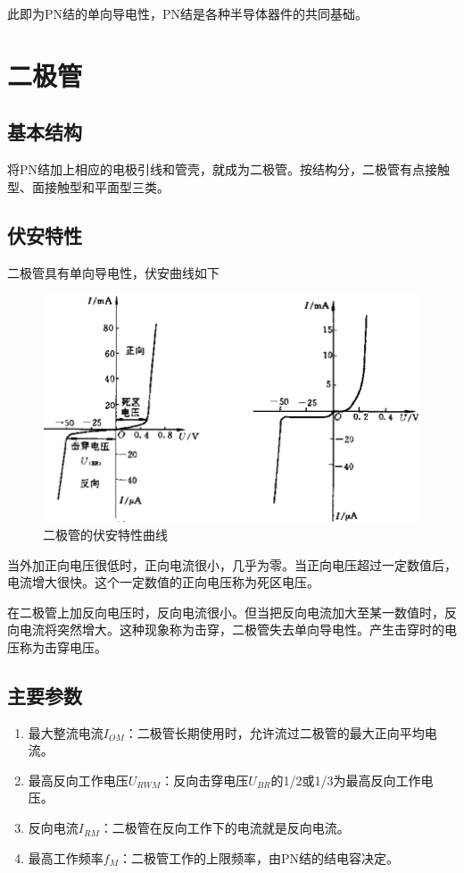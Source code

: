 \documentclass[12pt]{article}
\begin{document}
此即为PN结的单向导电性，PN结是各种半导体器件的共同基础。

\section{二极管}

\subsection{基本结构}

将PN结加上相应的电极引线和管壳，就成为二极管。按结构分，二极管有点接触型、面接触型和平面型三类。

\subsection{伏安特性}

二极管具有单向导电性，伏安曲线如下

\begin{figure}[!h]
    \centering
    \includegraphics[width=.8\textwidth]{graphics/Screenshot 2025-09-23 at 12.21.48.png}
    \caption{二极管的伏安特性曲线}
\end{figure}

当外加正向电压很低时，正向电流很小，几乎为零。当正向电压超过一定数值后，电流增大很快。这个一定数值的正向电压称为死区电压。

在二极管上加反向电压时，反向电流很小。但当把反向电流加大至某一数值时，反向电流将突然增大。这种现象称为击穿，二极管失去单向导电性。产生击穿时的电压称为击穿电压。

\subsection{主要参数}

\begin{enumerate}
    \item 最大整流电流\(I_{OM}\)：二极管长期使用时，允许流过二极管的最大正向平均电流。
    \item 最高反向工作电压\(U_{RWM}\)：反向击穿电压\(U_{BR}\)的1/2或1/3为最高反向工作电压。
    \item 反向电流\(I_{RM}\)：二极管在反向工作下的电流就是反向电流。
    \item 最高工作频率\(f_M\)：二极管工作的上限频率，由PN结的结电容决定。
\end{enumerate}
\end{document}
